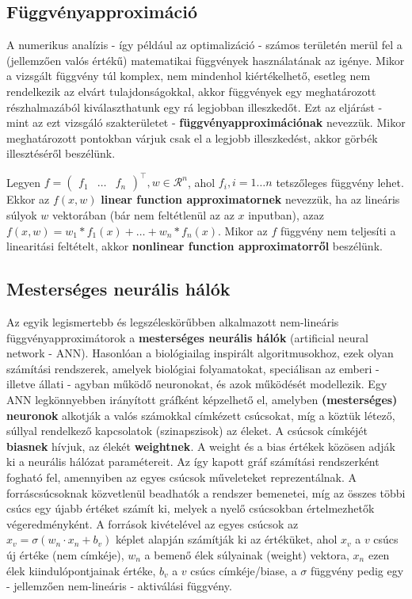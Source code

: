 \subsection{Függvényapproximáció}

A numerikus analízis - így például az optimalizáció - számos területén merül fel a (jellemzően valós értékű) matematikai függvények használatának az igénye. Mikor a vizsgált függvény túl komplex, nem mindenhol kiértékelhető, esetleg nem rendelkezik az elvárt tulajdonságokkal, akkor függvények egy meghatározott részhalmazából kiválaszthatunk egy rá legjobban illeszkedőt. Ezt az eljárást - mint az ezt vizsgáló szakterületet - \textbf{függvényapproximációnak} nevezzük. Mikor meghatározott pontokban várjuk csak el a legjobb illeszkedést, akkor görbék illesztéséről beszélünk.


Legyen $f = \left(\begin{smallmatrix}f_1 & \ldots & f_n\end{smallmatrix}\right)^\top, w \in \mathcal{R}^n$, ahol $f_i, i=1 \ldots n$ tetszőleges függvény lehet. Ekkor az $f(x, w)$ \textbf{linear function approximatornek} nevezzük, ha az lineáris súlyok $w$ vektorában (bár nem feltétlenül az az $x$ inputban), azaz $f(x,w) = w_1*f_1(x) + \ldots + w_n*f_n(x)$. Mikor az $f$ függvény nem teljesíti a linearitási feltételt, akkor \textbf{nonlinear function approximatorről} beszélünk.

\subsection{Mesterséges neurális hálók}

Az egyik legismertebb és legszéleskörűbben alkalmazott nem-lineáris függvényapproximátorok a \textbf{mesterséges neurális hálók} (artificial neural network - ANN). Hasonlóan a biológiailag inspirált algoritmusokhoz, ezek olyan számítási rendszerek, amelyek biológiai folyamatokat, speciálisan az emberi - illetve állati - agyban működő neuronokat, és azok működését modellezik. Egy ANN legkönnyebben irányított gráfként képzelhető el, amelyben \textbf{(mesterséges) neuronok} alkotják a valós számokkal címkézett csúcsokat, míg a köztük létező, súllyal rendelkező kapcsolatok (szinapszisok) az éleket. A csúcsok címkéjét \textbf{biasnek} hívjuk, az élekét \textbf{weightnek}. A weight és a bias értékek közösen adják ki a neurális hálózat paramétereit. Az így kapott gráf számítási rendszerként fogható fel, amennyiben az egyes csúcsok műveleteket reprezentálnak. A forráscsúcsoknak közvetlenül beadhatók a rendszer bemenetei, míg az összes többi csúcs egy újabb értéket számít ki, melyek a nyelő csúcsokban értelmezhetők végeredményként. A források kivételével az egyes csúcsok az $x_v=\sigma(w_n \cdot x_n +b_v)$ képlet alapján számítják ki az értéküket, ahol $x_v$ a $v$ csúcs új értéke (nem címkéje), $w_n$ a bemenő élek súlyainak (weight) vektora, $x_n$ ezen élek kiindulópontjainak értéke, $b_v$ a $v$ csúcs címkéje/biase, a $\sigma$ függvény pedig egy - jellemzően nem-lineáris - aktiválási függvény.

